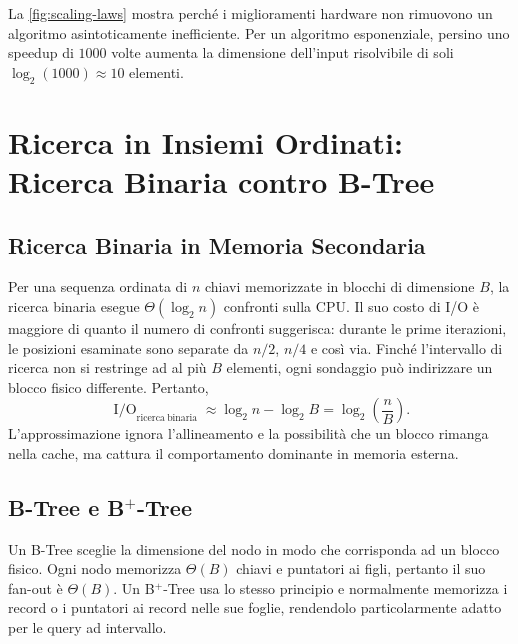 La \autoref{fig:scaling-laws} mostra perché i miglioramenti hardware non rimuovono un algoritmo asintoticamente inefficiente. Per un algoritmo esponenziale, persino uno speedup di $1000$ volte aumenta la dimensione dell'input risolvibile di soli $\log_2(1000)\approx 10$ elementi.

\section{Ricerca in Insiemi Ordinati: Ricerca Binaria contro B-Tree}
\label{sec:binary-search-btrees}

\subsection{Ricerca Binaria in Memoria Secondaria}
\label{subsec:external-binary-search}

Per una sequenza ordinata di $n$ chiavi memorizzate in blocchi di dimensione $B$, la ricerca binaria esegue $\Theta(\log_2 n)$ confronti sulla CPU. Il suo costo di I/O è maggiore di quanto il numero di confronti suggerisca: durante le prime iterazioni, le posizioni esaminate sono separate da $n/2$, $n/4$ e così via. Finché l'intervallo di ricerca non si restringe ad al più $B$ elementi, ogni sondaggio può indirizzare un blocco fisico differente. Pertanto,
\[
  \operatorname{I/O}_{\mathrm{ricerca\ binaria}}
  \approx \log_2 n-\log_2 B
  = \log_2\!\left(\frac{n}{B}\right).
\]
L'approssimazione ignora l'allineamento e la possibilità che un blocco rimanga nella cache, ma cattura il comportamento dominante in memoria esterna.

\subsection{B-Tree e \texorpdfstring{B$^+$-Tree}{B+-Tree}}
\label{subsec:btree}

Un B-Tree sceglie la dimensione del nodo in modo che corrisponda ad un blocco fisico. Ogni nodo memorizza $\Theta(B)$ chiavi e puntatori ai figli, pertanto il suo fan-out è $\Theta(B)$. Un B$^+$-Tree usa lo stesso principio e normalmente memorizza i record o i puntatori ai record nelle sue foglie, rendendolo particolarmente adatto per le query ad intervallo.

